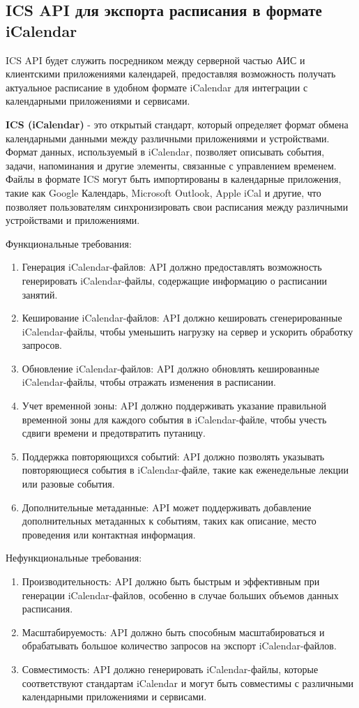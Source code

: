 \subsection{ICS API для экспорта расписания в формате iCalendar}
ICS API будет служить посредником между серверной частью АИС и клиентскими 
приложениями календарей,
предоставляя возможность получать актуальное расписание в удобном формате iCalendar 
для интеграции с календарными приложениями и сервисами.

\textbf{ICS (iCalendar)} - это открытый стандарт, 
который определяет формат обмена календарными данными между различными приложениями и устройствами. 
Формат данных, используемый в iCalendar, позволяет описывать события, задачи, напоминания и другие элементы, 
связанные с управлением временем. Файлы в формате ICS могут быть импортированы в календарные приложения, 
такие как Google Календарь, Microsoft Outlook, Apple iCal и другие, 
что позволяет пользователям синхронизировать свои расписания между различными устройствами и приложениями.

Функциональные требования:
\begin{enumerate}
  \item Генерация iCalendar-файлов: API должно предоставлять возможность генерировать iCalendar-файлы, 
  содержащие информацию о расписании занятий.
  \item Кеширование iCalendar-файлов: API должно кешировать сгенерированные iCalendar-файлы,
  чтобы уменьшить нагрузку на сервер и ускорить обработку запросов.
  \item Обновление iCalendar-файлов: API должно обновлять кешированные iCalendar-файлы,
  чтобы отражать изменения в расписании.
  \item Учет временной зоны: API должно поддерживать указание правильной временной зоны 
  для каждого события в iCalendar-файле, чтобы учесть сдвиги времени и предотвратить путаницу.
  \item Поддержка повторяющихся событий: API должно позволять указывать повторяющиеся события в 
  iCalendar-файле, такие как еженедельные лекции или разовые события.
  \item Дополнительные метаданные: API может поддерживать добавление дополнительных 
  метаданных к событиям, таких как описание, место проведения или контактная информация.
\end{enumerate}

Нефункциональные требования:
\begin{enumerate}
  \item Производительность: API должно быть быстрым и эффективным при генерации iCalendar-файлов, 
  особенно в случае больших объемов данных расписания.
  \item Масштабируемость: API должно быть способным масштабироваться и 
  обрабатывать большое количество запросов на экспорт iCalendar-файлов.
  \item Совместимость: API должно генерировать iCalendar-файлы, 
  которые соответствуют стандартам iCalendar и могут быть совместимы 
  с различными календарными приложениями и сервисами.
\end{enumerate}


